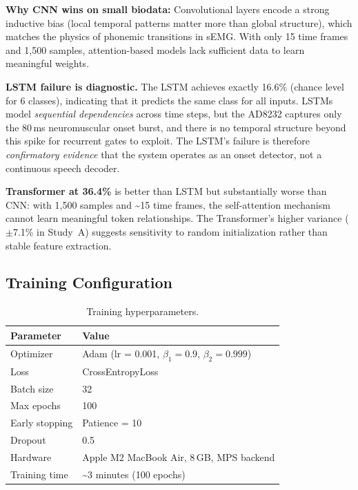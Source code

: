 \documentclass{article}
\begin{document}
\textbf{Why CNN wins on small biodata:} Convolutional layers encode a strong inductive bias (local temporal patterns matter more than global structure), which matches the physics of phonemic transitions in sEMG. With only 15 time frames and 1{,}500 samples, attention-based models lack sufficient data to learn meaningful weights.

\textbf{LSTM failure is diagnostic.} The LSTM achieves exactly 16.6\% (chance level for 6 classes), indicating that it predicts the same class for all inputs. LSTMs model \emph{sequential dependencies} across time steps, but the AD8232 captures only the 80\,ms neuromuscular onset burst, and there is no temporal structure beyond this spike for recurrent gates to exploit. The LSTM's failure is therefore \emph{confirmatory evidence} that the system operates as an onset detector, not a continuous speech decoder.

\textbf{Transformer at 36.4\%} is better than LSTM but substantially worse than CNN: with 1,500 samples and \textasciitilde15 time frames, the self-attention mechanism cannot learn meaningful token relationships. The Transformer's higher variance ($\pm$7.1\% in Study~A) suggests sensitivity to random initialization rather than stable feature extraction.

\subsection{Training Configuration}

\begin{table}[h]
\centering
\caption{Training hyperparameters.}
\label{tab:training}
\begin{tabular}{@{}ll@{}}
\toprule
Parameter & Value \\
\midrule
Optimizer & Adam (lr = 0.001, $\beta_1 = 0.9$, $\beta_2 = 0.999$) \\
Loss & CrossEntropyLoss \\
Batch size & 32 \\
Max epochs & 100 \\
Early stopping & Patience = 10 \\
Dropout & 0.5 \\
Hardware & Apple M2 MacBook Air, 8\,GB, MPS backend \\
Training time & \textasciitilde3 minutes (100 epochs) \\
\bottomrule
\end{tabular}
\end{table}
\end{document}

